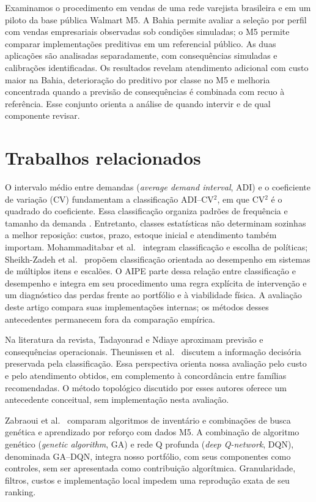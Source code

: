 \documentclass[preprint,12pt]{elsarticle}
\begin{document}
Examinamos o procedimento em vendas de uma rede varejista brasileira e em um piloto da base pública Walmart M5. A Bahia permite avaliar a seleção por perfil com vendas empresariais observadas sob condições simuladas; o M5 permite comparar implementações preditivas em um referencial público. As duas aplicações são analisadas separadamente, com consequências simuladas e calibrações identificadas. Os resultados revelam atendimento adicional com custo maior na Bahia, deterioração do preditivo por classe no M5 e melhoria concentrada quando a previsão de consequências é combinada com recuo à referência. Esse conjunto orienta a análise de quando intervir e de qual componente revisar.

\section{Trabalhos relacionados}
O intervalo médio entre demandas (\textit{average demand interval}, ADI) e o coeficiente de variação (CV) fundamentam a classificação ADI--CV$^2$, em que CV$^2$ é o quadrado do coeficiente. Essa classificação organiza padrões de frequência e tamanho da demanda \cite{syntetos2005}. Entretanto, classes estatísticas não determinam sozinhas a melhor reposição: custos, prazo, estoque inicial e atendimento também importam. Mohammaditabar et al.\ \cite{Mohammaditabar2012Integrated} integram classificação e escolha de políticas; Sheikh-Zadeh et al.\ \cite{SheikhZadeh2021PBIC} propõem classificação orientada ao desempenho em sistemas de múltiplos itens e escalões. O AIPE parte dessa relação entre classificação e desempenho e integra em seu procedimento uma regra explícita de intervenção e um diagnóstico das perdas frente ao portfólio e à viabilidade física. A avaliação deste artigo compara suas implementações internas; os métodos desses antecedentes permanecem fora da comparação empírica.

Na literatura da revista, Tadayonrad e Ndiaye \cite{sca_f81ad2b3e023} aproximam previsão e consequências operacionais. Theunissen et al.\ \cite{sca_c5c06dcbc9e5} discutem a informação decisória preservada pela classificação. Essa perspectiva orienta nossa avaliação pelo custo e pelo atendimento obtidos, em complemento à concordância entre famílias recomendadas. O método topológico discutido por esses autores oferece um antecedente conceitual, sem implementação nesta avaliação.

Zabraoui et al.\ \cite{sca_27e994c54848} comparam algoritmos de inventário e combinações de busca genética e aprendizado por reforço com dados M5. A combinação de algoritmo genético (\textit{genetic algorithm}, GA) e rede Q profunda (\textit{deep Q-network}, DQN), denominada GA--DQN, integra nosso portfólio, com seus componentes como controles, sem ser apresentada como contribuição algorítmica. Granularidade, filtros, custos e implementação local impedem uma reprodução exata de seu ranking.
\end{document}
